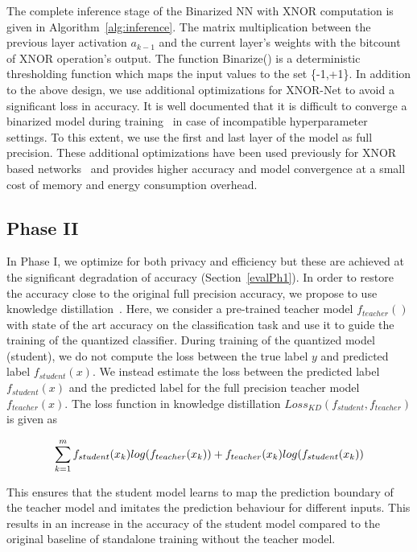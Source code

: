 The complete inference stage of the Binarized NN with XNOR computation is given in Algorithm~\ref{alg:inference}.
The matrix multiplication between the previous layer activation $a_{k-1}$ and the current layer's weights with the bitcount of XNOR operation's output.
The function Binarize() is a deterministic thresholding function which maps the input values to the set \{-1,+1\}.
In addition to the above design, we use additional optimizations for XNOR-Net to avoid a significant loss in accuracy.
It is well documented that it is difficult to converge a binarized model during training~\cite{AAAI1714619} in case of incompatible hyperparameter settings. To this extent, we use the first and last layer of the model as full precision.
These additional optimizations have been used previously for XNOR based networks~\cite{8114708,rastegari2016xnornet} and provides higher accuracy and model convergence at a small cost of memory and energy consumption overhead.







\subsection{Phase II}
\label{p2}

In Phase I, we optimize for both privacy and efficiency but these are achieved at the significant degradation of accuracy (Section~\ref{evalPh1}).
In order to restore the accuracy close to the original full precision accuracy, we propose to use knowledge distillation~\cite{44873}.
Here, we consider a pre-trained teacher model $f_{teacher}()$ with state of the art accuracy on the classification task and use it to guide the training of the quantized classifier.
During training of the quantized model (student), we do not compute the loss between the true label $y$ and predicted label $f_{student}(x)$.
We instead estimate the loss between the predicted label $f_{student}(x)$ and the predicted label for the full precision teacher model $f_{teacher}(x)$.
The loss function in knowledge distillation $Loss_{KD} (f_{student}, f_{teacher})$ is given as

\begin{equation}
\footnotesize
\sum_{k=1}^m f_{student}(x_k)log(f_{teacher}(x_k)) + f_{teacher}(x_k)log(f_{student}(x_k))
\end{equation}


This ensures that the student model learns to map the prediction boundary of the teacher model and imitates the prediction behaviour for different inputs.
This results in an increase in the accuracy of the student model compared to the original baseline of standalone training without the teacher model.
